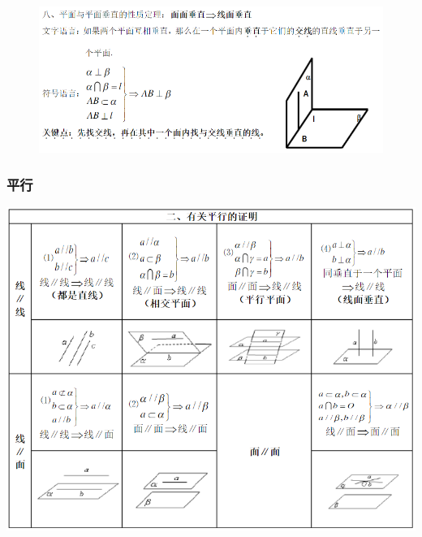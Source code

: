 \documentclass[hyperref, UTF8,11pt,a4paper]{ctexart} %
\begin{document}
	\begin{figure}[!h] %
		\centering
		\includegraphics[width=450pt]  {pic/litijihe/mmczxz.png} \\

	\end{figure}

\fi

\subsubsection{平行}
\begin{center}

	\includegraphics[width=420pt]  {pic/litijihe/pxzm.png} \\
\end{center}


\end{document}
